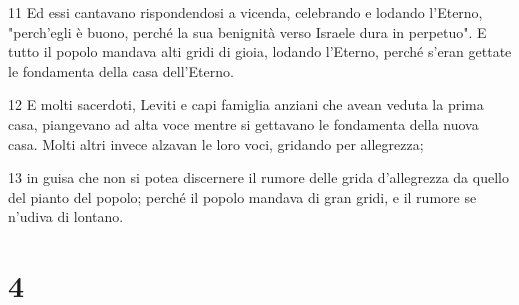 \par 11 Ed essi cantavano rispondendosi a vicenda, celebrando e lodando l'Eterno, "perch'egli è buono, perché la sua benignità verso Israele dura in perpetuo". E tutto il popolo mandava alti gridi di gioia, lodando l'Eterno, perché s'eran gettate le fondamenta della casa dell'Eterno.
\par 12 E molti sacerdoti, Leviti e capi famiglia anziani che avean veduta la prima casa, piangevano ad alta voce mentre si gettavano le fondamenta della nuova casa. Molti altri invece alzavan le loro voci, gridando per allegrezza;
\par 13 in guisa che non si potea discernere il rumore delle grida d'allegrezza da quello del pianto del popolo; perché il popolo mandava di gran gridi, e il rumore se n'udiva di lontano.

\chapter{4}

